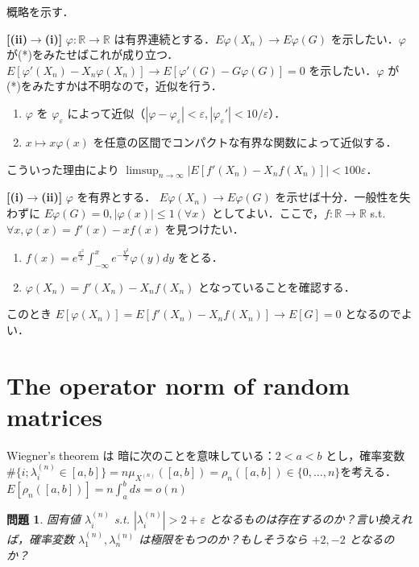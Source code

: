 \documentclass{ltjsarticle}
\makeatletter
\theoremstyle{mystyle1}
\theoremstyle{mystyle2}
\newtheorem{qes}{問題}
\theoremstyle{mystyle3}
\renewenvironment{proof}[1][\proofname]{\par
  \pushQED{\qed}%
  \normalfont
  \topsep6\p@\@plus6\p@ \trivlist
  \item[\hskip\labelsep{\bfseries\sffamily #1}]\ignorespaces
}{%
  \popQED\endtrivlist\@endpefalse
}
\renewcommand\proofname{証明}
\makeatother
\begin{document}
\begin{proof}
    概略を示す．

    \textbf{[(ii)$\to$(i)]} $\varphi:\mathbb{R}\to\mathbb{R}$ は有界連続とする．$E\varphi(X_n)\to E\varphi(G)$ を示したい．$\varphi$が(*)をみたせばこれが成り立つ．$E[\varphi'(X_n)-X_n\varphi(X_n)]\to E[\varphi'(G)-G\varphi(G)]=0$ を示したい．$\varphi$ が(*)をみたすかは不明なので，近似を行う．
    \begin{enumerate}
        \item $\varphi$ を $\varphi_\varepsilon$ によって近似（$|\varphi-\varphi_\varepsilon|<\varepsilon,|\varphi_\varepsilon'|<10/\varepsilon$）．
        \item $x\mapsto x\varphi(x)$ を任意の区間でコンパクトな有界な関数によって近似する．
    \end{enumerate}
    こういった理由により $\limsup_{n\to\infty}|E[f'(X_n)-X_nf(X_n)]|<100\varepsilon$．

    \textbf{[(i)$\to$(ii)]} $\varphi$ を有界とする． $E\varphi(X_n)\to E\varphi(G)$ を示せば十分．一般性を失わずに $E\varphi(G)=0,|\varphi(x)|\leq 1(\forall x)$ としてよい．ここで，$f:\mathbb{R}\to\mathbb{R}$ s.t. $\forall x,\varphi(x)=f'(x)-xf(x)$ を見つけたい．
    \begin{enumerate}
        \item $f(x)=e^{\frac{x^2}{2}}\int_{-\infty}^x e^{-\frac{y^2}{2}}\varphi(y)dy$ をとる．
        \item $\varphi(X_n)=f'(X_n)-X_nf(X_n)$ となっていることを確認する．
    \end{enumerate}
    このとき $E[\varphi(X_n)]=E[f'(X_n)-X_nf(X_n)]\to E[G]=0$ となるのでよい．

\end{proof}

\section{The operator norm of random matrices}

Wiegner's theorem は 暗に次のことを意味している：$2<a<b$ とし，確率変数 $\#\{i;\lambda_i^{(n)}\in[a,b]\}=n\mu_{X^{(n)}}([a,b])=\rho_n([a,b])\in\{0,\ldots,n\}$を考える．$E[\rho_n([a,b])]=n\int_a^b ds=o(n)$

\begin{qes}
    固有値 $\lambda_i^{(n)}$ s.t. $|\lambda_i^{(n)}|>2+\varepsilon$ となるものは存在するのか？言い換えれば，確率変数 $\lambda_1^{(n)},\lambda_n^{(n)}$ は極限をもつのか？もしそうなら $+2,-2$ となるのか？
\end{qes}
\end{document}
